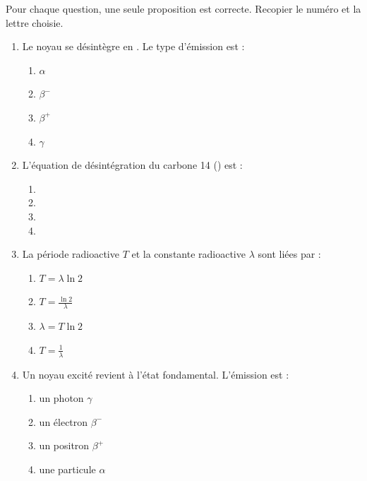 \documentclass[11pt]{article}
\begin{document}
\begin{exercice}
Pour chaque question, une seule proposition est correcte. Recopier le numéro et la lettre choisie.
\begin{enumerate}
    \item Le noyau  se désintègre en . Le type d'émission est :
    \begin{enumerate}
        \item $\alpha$ \item $\beta^-$ \item $\beta^+$ \item $\gamma$
    \end{enumerate}
    \item L'équation de désintégration du carbone 14 () est :
    \begin{enumerate}
        \item {}
        \item {}
        \item {}
        \item {}
    \end{enumerate}
    \item La période radioactive $T$ et la constante radioactive $\lambda$ sont liées par :
    \begin{enumerate}
        \item $T = \lambda \ln 2$ \item $T = \frac{\ln 2}{\lambda}$ \item $\lambda = T \ln 2$ \item $T = \frac{1}{\lambda}$
    \end{enumerate}
    \item Un noyau excité  revient à l'état fondamental. L'émission est :
    \begin{enumerate}
        \item un photon $\gamma$ \item un électron $\beta^-$ \item un positron $\beta^+$ \item une particule $\alpha$
    \end{enumerate}
\end{enumerate}
\end{exercice}
\end{document}
